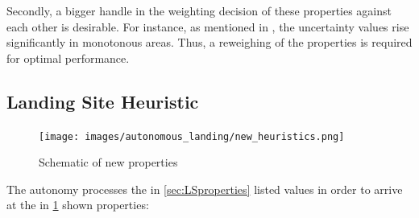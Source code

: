 Secondly, a bigger handle in the weighting decision of these properties against each other is desirable. For instance, as mentioned in \citet{LSD2}, the uncertainty values rise significantly in monotonous areas. Thus, a reweighing of the properties is required for optimal performance.

\subsection{Landing Site Heuristic}\label{subsec:heuristics}

\begin{figure}[h]
    \centering
    \texttt{[image: images/autonomous\_landing/new\_heuristics.png]}
    \caption{Schematic of new properties}
    \label{fig:new_properties}
    \end{figure}

The autonomy processes the in \cref{sec:LSproperties} listed values in order to arrive at the in \cref{fig:new_properties} shown properties:

